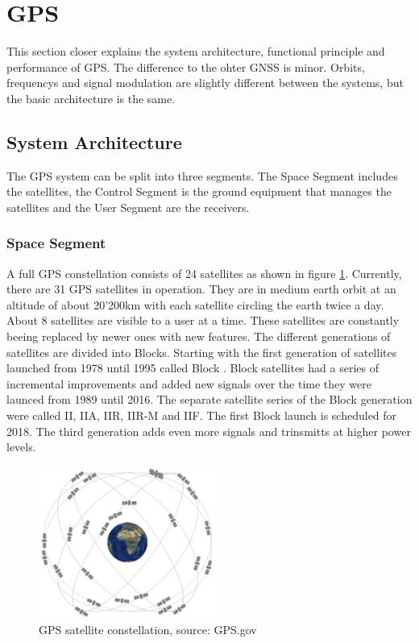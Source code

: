 \section{GPS}

This section closer explains the system architecture, functional principle and performance of GPS.
The difference to the ohter GNSS is minor.
Orbits, frequencys and signal modulation are slightly different between the systems, but the basic architecture is the same.


\subsection{System Architecture}

The GPS system can be split into three segments.
The Space Segment includes the satellites, the Control Segment is the ground equipment that manages the satellites and the User Segment are the receivers.

\subsubsection{Space Segment}

A full GPS constellation consists of 24 satellites as shown in figure \ref{fig:constellation}.
Currently, there are 31 GPS satellites in operation.
They are in medium earth orbit at an altitude of about 20'200km with each satellite circling the earth twice a day.
About 8 satellites are visible to a user at a time.
These satellites are constantly beeing replaced by newer ones with new features.
The different generations of satellites are divided into Blocks.
Starting with the first generation of satellites launched from 1978 until 1995 called Block .
Block  satellites had a series of incremental improvements and added new signals over the time they were launced from 1989 until 2016.
The separate satellite series of the Block  generation were called II, IIA, IIR, IIR-M and IIF.
The first Block  launch is scheduled for 2018.
The third generation adds even more signals and trinsmitts at higher power levels.

\begin{figure}[ht]
 \centering
 \includegraphics[height=5cm]{images/constellation.jpg}
 \caption{GPS satellite constellation, source: GPS.gov}
 \label{fig:constellation}
\end{figure}

